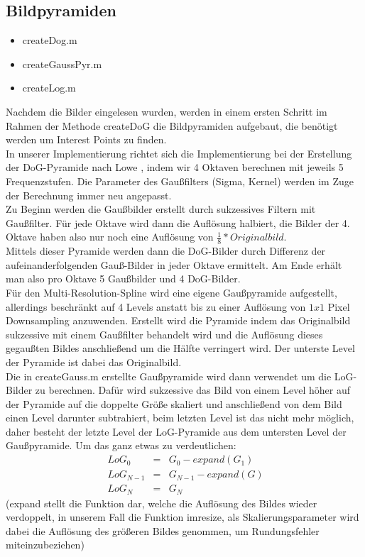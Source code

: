 \documentclass[deutsch]{scrartcl}
\begin{document}
\subsection{Bildpyramiden}
\begin{itemize}
	\item createDog.m 
	\item createGaussPyr.m 
	\item createLog.m
\end{itemize}
Nachdem die Bilder eingelesen wurden, werden in einem ersten Schritt im Rahmen
der Methode createDoG die Bildpyramiden aufgebaut, die benötigt werden um
Interest Points zu finden. \\
In unserer Implementierung richtet sich die Implementierung bei der Erstellung der DoG-Pyramide nach Lowe \cite{lowe04}, indem wir 4 Oktaven berechnen mit jeweils 5 Frequenzstufen. Die Parameter des Gaußfilters (Sigma, Kernel) werden im Zuge der Berechnung immer neu angepasst.\\
Zu Beginn werden die Gaußbilder erstellt durch sukzessives Filtern mit Gaußfilter. Für jede Oktave wird dann die Auflösung halbiert, die Bilder der 4. Oktave haben also nur noch eine Auflösung von $\frac{1}{8} * Originalbild$.\\
Mittels dieser Pyramide werden dann die DoG-Bilder durch Differenz der aufeinanderfolgenden Gauß-Bilder in jeder Oktave ermittelt. Am Ende erhält man also pro Oktave 5 Gaußbilder und 4 DoG-Bilder.\\
Für den Multi-Resolution-Spline wird eine eigene Gaußpyramide aufgestellt, allerdings beschränkt auf 4 Levels anstatt bis zu einer Auflösung von $1x1$ Pixel Downsampling anzuwenden. Erstellt wird die Pyramide indem das Originalbild sukzessive mit einem Gaußfilter behandelt wird und die Auflösung dieses gegaußten Bildes anschließend um die Hälfte verringert wird. Der unterste Level der Pyramide ist dabei das Originalbild.\\
Die in createGauss.m erstellte Gaußpyramide wird dann verwendet um die LoG-Bilder zu berechnen. Dafür wird sukzessive das Bild von einem Level höher auf der Pyramide auf die doppelte Größe skaliert und anschließend von dem Bild einen Level darunter subtrahiert, beim letzten Level ist das nicht mehr möglich, daher besteht der letzte Level der LoG-Pyramide aus dem untersten Level der Gaußpyramide. Um das ganz etwas zu verdeutlichen:
\begin{eqnarray*}
\ LoG_0 &=& G_0 - expand(G_1) \\
\ LoG_{N-1} &=& G_{N-1} - expand(G) \\
\ LoG_N &=& G_N
\end{eqnarray*}
(expand stellt die Funktion dar, welche die Auflösung des Bildes wieder verdoppelt, in unserem Fall die Funktion imresize, als Skalierungsparameter wird dabei die Auflösung des größeren Bildes genommen, um Rundungsfehler miteinzubeziehen)
\end{document}
